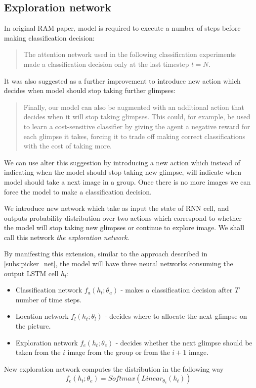 {\subsection{Exploration network}
In original RAM paper, model is required to execute a number of
steps before making classification decision:
\blockquote{
The attention network used in the following classification experiments made
a classification decision only at the last timestep $t = N$.
}\cite{DBLP:journals/corr/MnihHGK14}
It was also suggested as a further improvement to introduce new action
which decides when model should stop taking further glimpses:
\blockquote{
Finally, our model can also be augmented with an additional action that decides
when it will stop taking glimpses. This could, for example, be used to learn a
cost-sensitive classifier by giving the agent a negative reward for each glimpse
it takes, forcing it to trade off making correct classifications with the cost of
taking more. \cite{DBLP:journals/corr/MnihHGK14}
}

We can use alter this suggestion by introducing a new action which
instead of indicating when the model should stop taking new glimpse, will
indicate when model should take a next image in a group. Once there is no more images
we can force the model to make a classification decision.

We introduce new network which take as input the state of RNN cell, and outputs
probability distribution over two actions which correspond to whether the model
will stop taking new glimpses
or continue to explore image.
We shall call this network \emph{the exploration network}.

By manifesting
this extension, similar to the approach described in \autoref{subs:picker_net},
the model will have three neural networks consuming
the output LSTM cell $h_t$:
\begin{itemize}
	\item Classification network $f_a(h_t; \theta_a)$ - makes a classification
		decision after $T$ number of time steps.
	\item Location network $f_l(h_t; \theta_l)$ - decides where to allocate the next glimpse
	on the picture.
	\item Exploration network $f_e(h_t; \theta_e)$ - decides whether the next glimpse
	should be taken
	from the $i$ image from the group or from the $i+1$ image.
\end{itemize}

New exploration network computes the distribution in the following way
\begin{equation}
	f_e(h_t; \theta_e) = Softmax(Linear_{\theta_e}(h_t))
\end{equation}

}
